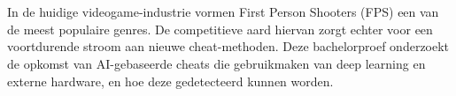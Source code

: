 
%
%
%
%
%

%



\chapter*{}

In de huidige videogame-industrie vormen First Person Shooters (FPS) een van de meest populaire genres. De competitieve aard hiervan zorgt echter voor een voortdurende stroom aan nieuwe cheat-methoden. Deze bachelorproef onderzoekt de opkomst van AI-gebaseerde cheats die gebruikmaken van deep learning en externe hardware, en hoe deze gedetecteerd kunnen worden.  

